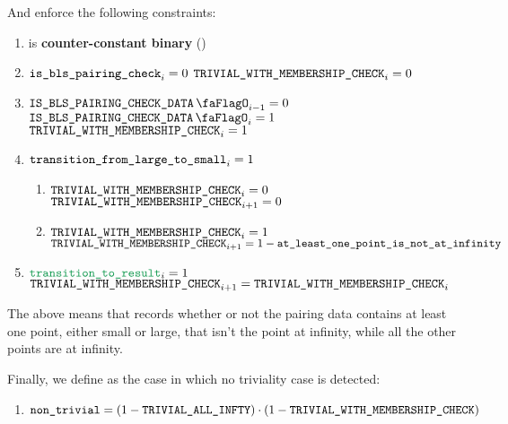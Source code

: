 And enforce the following constraints:
\begin{enumerate}
    \item \trivialWithMembershipCheck{} is \textbf{counter-constant binary} \quad (\trash)
    \item \If $\texttt{is\_bls\_pairing\_check} _{i} = 0$ \Then $\texttt{TRIVIAL\_WITH\_MEMBERSHIP\_CHECK} _{i} = 0$
    \item \If $\isBlsPairingCheckData_{i - 1} = 0$ \et $\isBlsPairingCheckData _{i} = 1$ \Then $\texttt{TRIVIAL\_WITH\_MEMBERSHIP\_CHECK}_{i} = 1$
    \item \If $\texttt{transition\_from\_large\_to\_small}_{i} = 1$ \Then 
          \begin{enumerate}
              \item \If $\texttt{TRIVIAL\_WITH\_MEMBERSHIP\_CHECK} _{i} = 0$ \Then $\texttt{TRIVIAL\_WITH\_MEMBERSHIP\_CHECK} _{i + 1} = 0$
              \item \If $\texttt{TRIVIAL\_WITH\_MEMBERSHIP\_CHECK} _{i} = 1$ \Then $\texttt{TRIVIAL\_WITH\_MEMBERSHIP\_CHECK} _{i + 1} = 
              1 - \texttt{at\_least\_one\_point\_is\_not\_at\_infinity}$
          \end{enumerate}
    \item \If $\locTransitionToResult_{i} = 1$ \Then \\ $\texttt{TRIVIAL\_WITH\_MEMBERSHIP\_CHECK}_{i+1} = \texttt{TRIVIAL\_WITH\_MEMBERSHIP\_CHECK}_{i}$
\end{enumerate}
\saNote{} The above means that \trivialWithMembershipCheck{} records whether or not the pairing data contains at least one point, either small or large, that isn't the point at infinity, while all the other points are at infinity.

Finally, we define \locNonTrivial{} as the case in which no triviality case is detected:
\begin{enumerate}
    \item $\texttt{non\_trivial} = (1 - \texttt{TRIVIAL\_ALL\_INFTY}) \cdot (1 - \texttt{TRIVIAL\_WITH\_MEMBERSHIP\_CHECK})$
\end{enumerate}